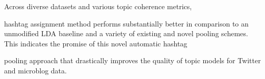 \documentclass{sig-alternate}
\begin{document}

Across diverse datasets and various topic coherence metrics,  hashtag assignment method performs substantially better in comparison to an unmodified LDA baseline and a variety of existing and novel
pooling schemes. This indicates the promise of this novel automatic
hashtag pooling approach that drastically improves the quality of topic models for Twitter and microblog data.


\end{document}
